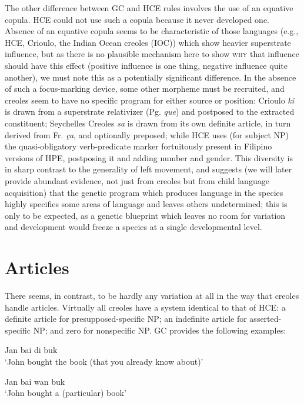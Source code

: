The other difference between GC and HCE rules involves the use of an equative copula. HCE could not use such a copula because it never developed one. Absence of an equative copula seems to be characteristic of those languages (e.g., HCE, Crioulo, the Indian Ocean creoles (IOC)) which show heavier superstrate influence, but as there is no plausible mechanism here to show \textsc{why} that influence should have this effect (positive influence is one thing, negative influence quite
another), we must note this as a potentially significant difference. In the absence of such a focus-marking device, some other morpheme must be recruited, and creoles seem to have no specific program for either source or position: Crioulo \textit{ki} is drawn from a superstrate rela\-tivizer (Pg. \textit{que}) and postposed to the extracted constituent; Seychelles Creoles \textit{sa} is drawn from its own definite article, in turn derived from Fr. \textit{ça}, and optionally preposed; while HCE uses (for subject NP) the quasi-obligatory verb-predicate marker fortuitously present in Filipino versions of HPE, postposing it and adding number and gender. This diversity is in sharp contrast to the generality of left movement, and suggests (we will later provide abundant evidence, not just from creoles but from child language acquisition) that the genetic program which produces language in the species highly specifies some areas of language and leaves others undetermined; this is only to be expected, as a genetic blueprint which leaves no room for variation and development would freeze a species at a single developmental level.

\section{Articles}

There seems, in contrast, to be hardly any variation at all in the way that creoles handle articles. Virtually all creoles have a system identical to that of HCE: a definite article for presupposed-specific NP; an indefinite article for asserted-specific NP; and zero for nonspecific NP. GC provides the following examples:


\ea\label{ex:2:13}
Jan bai di buk\\
\glt `John bought the book (that you already know about)'
\z

\ea\label{ex:2:14}
 Jan bai wan buk\\
\glt `John bought a (particular) book'
\z



